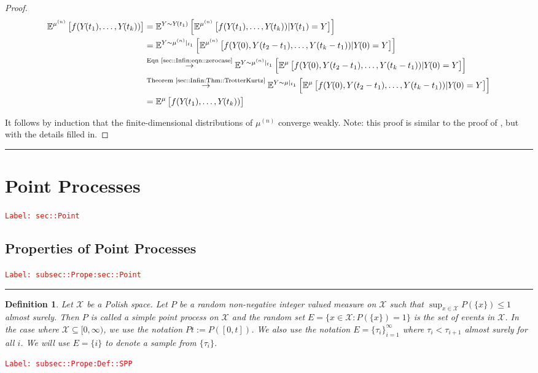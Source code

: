 \documentclass[12pt]{article}
\newcommand{\mb}{\mathbb}
\newcommand{\mc}{\mathcal}
\newcommand{\ra}{\rightarrow}
\newcommand{\os}{\overset}
\newcommand{\te}{\text}
\newcommand{\tr}{\textcolor{red}}
\newcommand{\labe}[1]{\tr{\texttt{Label: #1}}}
\newcommand{\lin}{\rule{\linewidth}{0.4 pt}}
\newcommand{\exmu}[2]{\mb{E}^{#1}\left[#2\right]}	%
\newcommand{\x}{x}								%
\renewcommand{\t}{t}							%
\newcommand{\cind}[1]{_{#1}}					%
\newcommand{\tp}[1]{(#1)}						%
\newcommand{\sln}[1]{^{(#1)}}					%
\newcommand{\indx}[1]{_{#1}}					%
\newcommand{\m}{\mu}							%
\newcommand{\XX}{Y}								%
\newcommand{\rt}{\tau}							%
\renewcommand{\it}{k}							%
\newcommand{\rp}{P}								%
\newcommand{\spce}{\mc{X}}						%
\newcommand{\evs}{E}							%
\newtheorem{defn}[thms]{Definition}
\begin{document}
\begin{proof}
\begin{align*}
\exmu{\m\sln{n}}{f(\XX\cind{}\tp{\t\indx{1}},\dots,\XX\cind{}\tp{\t\indx{\it}})}&= \exmu{\XX\sim \XX\cind{}\tp{\t\indx{1}}}{\exmu{\m\sln{n}}{f(\XX\cind{}\tp{\t\indx{1}},\dots,\XX\cind{}\tp{\t\indx{\it}})|\XX\cind{}\tp{\t\indx{1}}=\XX}}\\
&=\exmu{\XX\sim \m\sln{n}|_{\t\indx{1}}}{\exmu{\m\sln{n}}{f(\XX\cind{}\tp{0},\XX\tp{\t\indx{2}-\t\indx{1}},\dots,\XX\tp{\t\indx{\it}-\t\indx{1}})|\XX\cind{}\tp{0}=\XX}}\\
&\os{\te{Eqn \eqref{sec::Infin:eqn::zerocase}}}{\ra} \exmu{\XX\sim \m\sln{n}|_{\t\indx{1}}}{\exmu{\m}{f(\XX\cind{}\tp{0},\XX\tp{\t\indx{2}-\t\indx{1}},\dots,\XX\tp{\t\indx{\it}-\t\indx{1}})|\XX\cind{}\tp{0}=\XX}}\\
&\os{\te{Theorem \ref{sec::Infin:Thm::TrotterKurtz}}}{\ra} \exmu{\XX\sim \m|_{\t\indx{1}}}{\exmu{\m}{f(\XX\cind{}\tp{0},\XX\tp{\t\indx{2}-\t\indx{1}},\dots,\XX\tp{\t\indx{\it}-\t\indx{1}})|\XX\cind{}\tp{0}=\XX}}\\
&=\exmu{\m}{f(\XX\cind{}\tp{\t\indx{1}},\dots,\XX\cind{}\tp{\t\indx{\it}})}
\end{align*}

It follows by induction that the finite-dimensional distributions of \(\m\sln{n}\) converge weakly. Note: this proof is similar to the proof of \cite[Theorem 4.2]{Kur81}, but with the details filled in.
\end{proof}

\lin 

\section{Point Processes}
\label{sec::Point}\labe{sec::Point}

\subsection{Properties of Point Processes}
\label{subsec::Prope:sec::Point}\labe{subsec::Prope:sec::Point}

\lin

\begin{defn}
Let \(\spce\) be a Polish space. Let \(\rp\) be a random non-negative integer valued measure on \(\spce\) such that \(\sup_{\x \in \spce} \rp(\{\x\})\leq 1\) almost surely. Then \(\rp\) is called a simple point process on \(\spce\) and the random set \(E = \{\x \in \spce: \rp(\{\x\}) = 1\}\) is the set of events in \(\spce\). In the case where \(\spce \subseteq [0,\infty)\), we use the notation \(\rp{\t} := \rp([0,\t])\). We also use the notation \(\evs = \{\rt\indx{i}\}_{i=1}^{\infty}\) where \(\rt\indx{i} < \rt\indx{i+1}\) almost surely for all \(i\). We will use \(\evs = \{	{i}\}\) to denote a sample from \(\{\rt\indx{i}\}\).
\label{subsec::Prope:Def::SPP}
\end{defn}
\labe{subsec::Prope:Def::SPP}
\end{document}
